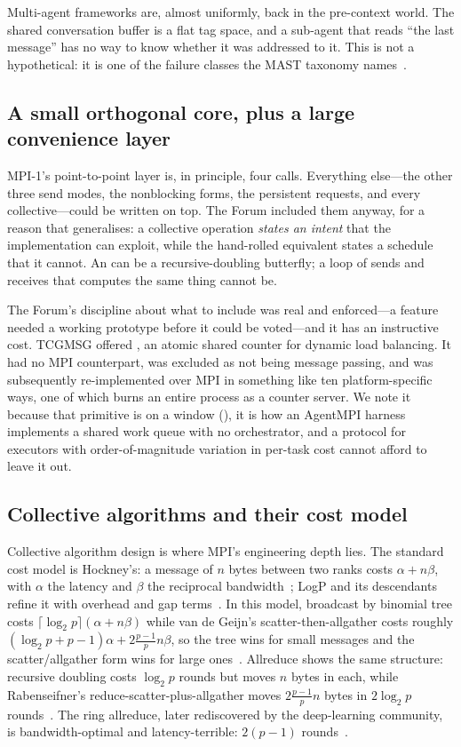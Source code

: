 Multi-agent frameworks are, almost uniformly, back in the pre-context world.
The shared conversation buffer is a flat tag space, and a sub-agent that
reads ``the last message'' has no way to know whether it was addressed to
it. This is not a hypothetical: it is one of the failure classes the MAST
taxonomy names~\cite{cemri2025mast}.

\subsection{A small orthogonal core, plus a large convenience layer}

MPI-1's point-to-point layer is, in principle, four calls. Everything
else---the other three send modes, the nonblocking forms, the persistent
requests, and every collective---could be written on top. The Forum included
them anyway, for a reason that generalises: a collective operation
\emph{states an intent} that the implementation can exploit, while the
hand-rolled equivalent states a schedule that it cannot. An 
can be a recursive-doubling butterfly; a loop of sends and receives that
computes the same thing cannot be.

The Forum's discipline about what to include was real and enforced---a
feature needed a working prototype before it could be voted---and it has an
instructive cost. TCGMSG offered , an atomic shared counter for
dynamic load balancing. It had no MPI counterpart, was excluded as not being
message passing, and was subsequently re-implemented over MPI in something
like ten platform-specific ways, one of which burns an entire process as a
counter server. We note it because that primitive is
 on a window (), it is how an
AgentMPI harness implements a shared work queue with no orchestrator, and a
protocol for executors with order-of-magnitude variation in per-task cost
cannot afford to leave it out.

\subsection{Collective algorithms and their cost model}

Collective algorithm design is where MPI's engineering depth lies. The
standard cost model is Hockney's: a message of $n$ bytes between two ranks
costs $\alpha + n\beta$, with $\alpha$ the latency and $\beta$ the
reciprocal bandwidth~\cite{Hockney1994}; LogP and its
descendants refine it with overhead and gap
terms~\cite{Culler1993,Alexandrov1995}. In this model,
broadcast by binomial tree costs $\lceil\log_2 p\rceil(\alpha + n\beta)$
while van de Geijn's scatter-then-allgather costs roughly
$(\log_2 p + p - 1)\alpha + 2\frac{p-1}{p}n\beta$, so the tree wins for
small messages and the scatter/allgather form wins for large
ones~\cite{Thakur2005,Chan2007}. Allreduce shows the
same structure: recursive doubling costs $\log_2 p$ rounds but moves $n$
bytes in each, while Rabenseifner's reduce-scatter-plus-allgather moves
$2\frac{p-1}{p}n$ bytes in $2\log_2 p$
rounds~\cite{Rabenseifner2004}. The ring allreduce, later
rediscovered by the deep-learning community, is bandwidth-optimal and
latency-terrible: $2(p-1)$ rounds~\cite{Patarasuk2009}.

